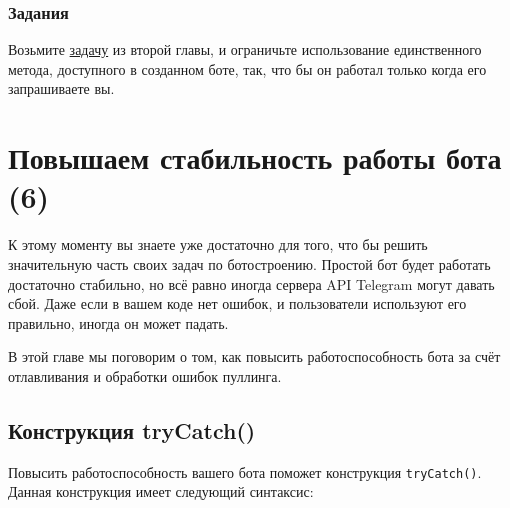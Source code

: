 \documentclass[
]{book}
\begin{document}
\hypertarget{ux437ux430ux434ux430ux43dux438ux44f-4}{%
\subsection{Задания}\label{ux437ux430ux434ux430ux43dux438ux44f-4}}

Возьмите \href{-updater.html\#задания-1}{задачу} из второй главы, и ограничьте использование единственного метода, доступного в созданном боте, так, что бы он работал только когда его запрашиваете вы.

\hypertarget{ux43fux43eux432ux44bux448ux430ux435ux43c-ux441ux442ux430ux431ux438ux43bux44cux43dux43eux441ux442ux44c-ux440ux430ux431ux43eux442ux44b-ux431ux43eux442ux430-6}{%
\chapter{Повышаем стабильность работы бота (6)}\label{ux43fux43eux432ux44bux448ux430ux435ux43c-ux441ux442ux430ux431ux438ux43bux44cux43dux43eux441ux442ux44c-ux440ux430ux431ux43eux442ux44b-ux431ux43eux442ux430-6}}

К этому моменту вы знаете уже достаточно для того, что бы решить значительную часть своих задач по ботостроению. Простой бот будет работать достаточно стабильно, но всё равно иногда сервера API Telegram могут давать сбой. Даже если в вашем коде нет ошибок, и пользователи используют его правильно, иногда он может падать.

В этой главе мы поговорим о том, как повысить работоспособность бота за счёт отлавливания и обработки ошибок пуллинга.

\hypertarget{ux43aux43eux43dux441ux442ux440ux443ux43aux446ux438ux44f-trycatch}{%
\section{Конструкция tryCatch()}\label{ux43aux43eux43dux441ux442ux440ux443ux43aux446ux438ux44f-trycatch}}

Повысить работоспособность вашего бота поможет конструкция \texttt{tryCatch()}. Данная конструкция имеет следующий синтаксис:
\end{document}
